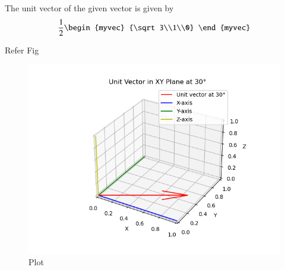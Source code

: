 \documentclass[journal]{IEEEtran}
\begin{document}
The unit  vector of the given vector is given by
\begin{align*}
\frac{1}{2}
         \begin{myvec}
         {\sqrt3\\1\\0}
        \end{myvec}   
\end{align*}

Refer Fig
\begin{figure}
    \centering
    \includegraphics[width=0.8\columnwidth]{figs/Fig2.png}
    \caption{Plot}
    \label{fig:placeholder}
\end{figure}
\end{document}
